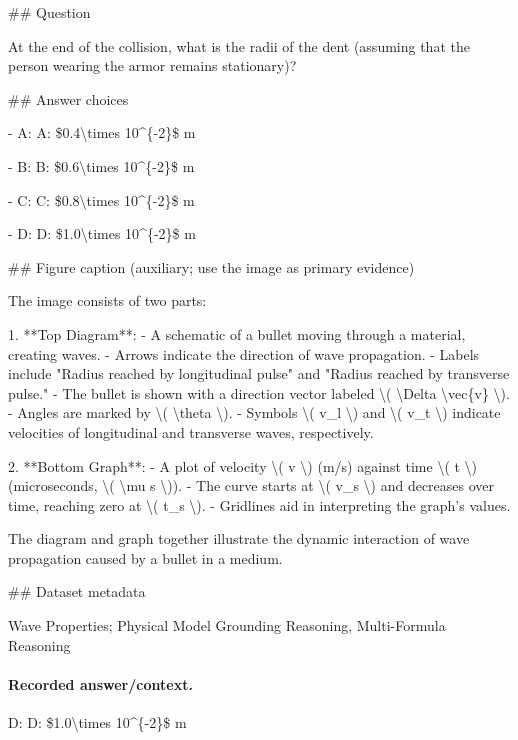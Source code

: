 \#\# Question

At the end of the collision, what is the radii of the dent (assuming that the person wearing the armor remains stationary)?

\#\# Answer choices

- A: A: \$0.4\textbackslash{}times 10\textasciicircum{}\{-2\}\$ m

- B: B: \$0.6\textbackslash{}times 10\textasciicircum{}\{-2\}\$ m

- C: C: \$0.8\textbackslash{}times 10\textasciicircum{}\{-2\}\$ m

- D: D: \$1.0\textbackslash{}times 10\textasciicircum{}\{-2\}\$ m

\#\# Figure caption (auxiliary; use the image as primary evidence)

The image consists of two parts:

1. **Top Diagram**:
   - A schematic of a bullet moving through a material, creating waves.
   - Arrows indicate the direction of wave propagation.
   - Labels include "Radius reached by longitudinal pulse" and "Radius reached by transverse pulse."
   - The bullet is shown with a direction vector labeled \textbackslash{}( \textbackslash{}Delta \textbackslash{}vec\{v\} \textbackslash{}).
   - Angles are marked by \textbackslash{}( \textbackslash{}theta \textbackslash{}).
   - Symbols \textbackslash{}( v\_l \textbackslash{}) and \textbackslash{}( v\_t \textbackslash{}) indicate velocities of longitudinal and transverse waves, respectively.

2. **Bottom Graph**:
   - A plot of velocity \textbackslash{}( v \textbackslash{}) (m/s) against time \textbackslash{}( t \textbackslash{}) (microseconds, \textbackslash{}( \textbackslash{}mu s \textbackslash{})).
   - The curve starts at \textbackslash{}( v\_s \textbackslash{}) and decreases over time, reaching zero at \textbackslash{}( t\_s \textbackslash{}).
   - Gridlines aid in interpreting the graph's values.

The diagram and graph together illustrate the dynamic interaction of wave propagation caused by a bullet in a medium.

\#\# Dataset metadata

Wave Properties; Physical Model Grounding Reasoning, Multi-Formula Reasoning

\paragraph{Recorded answer/context.}
D: D: \$1.0\textbackslash{}times 10\textasciicircum{}\{-2\}\$ m

